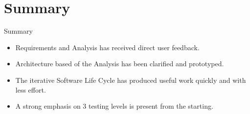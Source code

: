 \documentclass{beamer}
\begin{document}
\section*{Summary}

\begin{frame}{Summary}

\begin{itemize}
\item
Requirements and Analysis has received direct user feedback.
\item
Architecture based of the Analysis has been clarified and prototyped. 
\item 
The iterative Software Life Cycle has produced useful work quickly and with less effort.
\item
A strong emphasis on 3 testing levels is present from the starting.
\end{itemize}
\end{frame}
\end{document}
